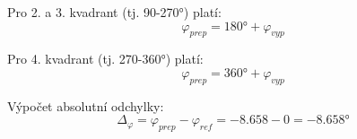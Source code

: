 \documentclass{protokol}
\begin{document}
    \noindent Pro 2. a 3. kvadrant (tj. 90-270°) platí:
    \begin{equation} \label{rov:kvadrant2}
        \varphi_{prep} = 180\text{°} + \varphi_{vyp}
    \end{equation}

    \noindent Pro 4. kvadrant (tj. 270-360°) platí:
    \begin{equation} \label{rov:kvadrant3}
        \varphi_{prep} = 360\text{°} + \varphi_{vyp}
    \end{equation}

    \noindent Výpočet absolutní odchylky:
    \begin{equation} \label{rov:kvadrant4}
        \Delta_{\varphi} = \varphi_{prep} - \varphi_{ref} = -8.658 - 0 = -8.658 \text{°}
    \end{equation}
\end{document}
